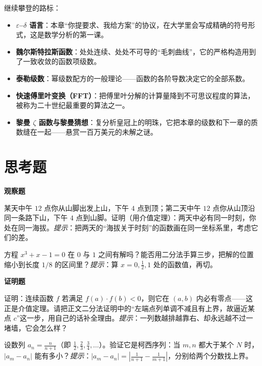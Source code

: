 \begin{pandeng}
继续攀登的路标：

\begin{itemize}
  \item \textbf{$\varepsilon$--$\delta$ 语言}：本章“你提要求、我给方案”的协议，在大学里会写成精确的符号形式，这是数学分析的第一课。
  \item \textbf{魏尔斯特拉斯函数}：处处连续、处处不可导的“毛刺曲线”，它的严格构造用到了一致收敛的函数项级数。
  \item \textbf{泰勒级数}：幂级数配方的一般理论——函数的各阶导数决定它的全部系数。
  \item \textbf{快速傅里叶变换（FFT）}：把傅里叶分解的计算量降到不可思议程度的算法，被称为二十世纪最重要的算法之一。
  \item \textbf{黎曼 $\zeta$ 函数与黎曼猜想}：复分析皇冠上的明珠，它把本章的级数和下一章的质数缝在一起——悬赏一百万美元的未解之谜。
\end{itemize}
\end{pandeng}

\section*{思考题}

\textbf{观察题}
\begin{sikao}
  \item 某天中午 $12$ 点你从山脚出发上山，下午 $4$ 点到顶；第二天中午 $12$ 点你从山顶沿同一条路下山，下午 $4$ 点到山脚。证明（用介值定理）：两天中必有同一时刻，你处在同一海拔。\emph{提示}：把两天的“海拔关于时刻”的函数画在同一坐标系里，考虑它们的差。
  \item 方程 $x^3+x-1=0$ 在 $0$ 与 $1$ 之间有解吗？能否用二分法手算三步，把解的位置缩小到长度 $1/8$ 的区间里？\emph{提示}：算 $x=0,\frac12,1$ 处的函数值，再切。
\end{sikao}

\textbf{证明题}
\begin{sikao}
  \setcounter{sikaoi}{2}
  \item 证明：连续函数 $f$ 若满足 $f(a)\cdot f(b)<0$，则它在 $(a,b)$ 内必有零点——这正是介值定理。请把正文二分法证明中的“左端点列单调不减且有上界，故逼近某点 $c$”这一步，用自己的话补全理由。\emph{提示}：一列数越排越靠右、却永远越不过一堵墙，它会怎么样？
  \item 设数列 $a_n=\frac{n}{n+1}$（即 $\frac12,\frac23,\frac34,\dots$）。验证它是柯西序列：当 $m,n$ 都大于某个 $N$ 时，$|a_m-a_n|$ 能有多小？\emph{提示}：$|a_m-a_n|=\left|\frac{1}{n+1}-\frac{1}{m+1}\right|$，分别给两个分数找上界。
\end{sikao}

